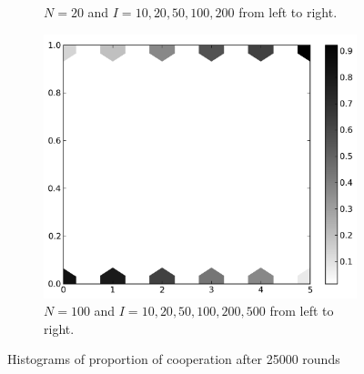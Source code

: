 \documentclass{amsart}
\begin{document}
\begin{figure}[h!tbp]
\begin{subfigure}{.31\linewidth}
    \caption{$N=20$ and $I = 10,20,50,100,200$ from left to right.}
    \label{fig:pop20iter}
  \end{subfigure}
  \hspace{.01\linewidth}
  \begin{subfigure}{.31\linewidth}
    \centering
    \includegraphics[width=\linewidth]{pop100iter.png}
    \caption{$N=100$ and $I = 10,20,50,100,200,500$ from left to
      right.}
    \label{fig:pop100iter}
  \end{subfigure}
  \caption{Histograms of proportion of cooperation after 25000 rounds}
\end{figure}
\end{document}
